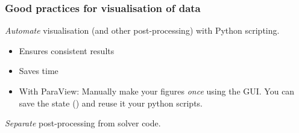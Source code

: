 \begin{frame}[fragile]
\frametitle{Good practices for visualisation of data}

  \emph{Automate} visualisation (and other post-processing) with Python scripting.

  \begin{itemize}
  \item Ensures consistent results
  \item Saves time
  \item With ParaView: Manually make your figures \emph{once} using the GUI. You can save the state () and reuse it your python scripts.
  \end{itemize}

  \emph{Separate} post-processing from solver code.

\end{frame}
